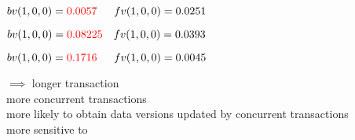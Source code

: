 \begin{frame}{}
\end{frame}

\begin{frame}{}
  \begin{description}[issueDelay = 20ms:]
    \setlength{\itemsep}{10pt}
    \item[issueDelay = 20ms:] $bv(1,0,0) = \textcolor{red}{0.0057} \quad\;\; fv(1,0,0) = 0.0251$
    \item[issueDelay = 15ms:] $bv(1,0,0) = \textcolor{red}{0.08225} \quad fv(1,0,0) = 0.0393$
    \item[issueDelay = 5ms:] $bv(1,0,0) = \textcolor{red}{0.1716} \quad\;\; fv(1,0,0) = 0.0045$
  \end{description}

  \pause
  \vspace{0.50cm}
  \begin{center}
     $\implies$ longer transaction \\[5pt]
    more concurrent transactions \\[5pt]
    more likely to obtain data versions updated by concurrent transactions \\[5pt]
    more sensitive to \blue{$\ktwofv$}
  \end{center}
\end{frame}

